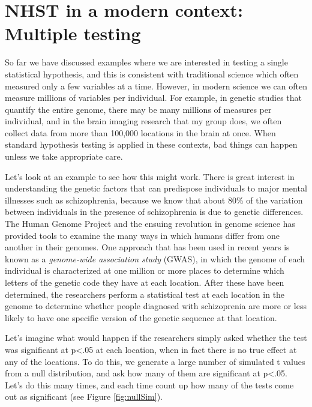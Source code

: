 \documentclass[12pt,]{book}
\theoremstyle{definition}
\theoremstyle{definition}
\theoremstyle{definition}
\theoremstyle{remark}
\begin{document}
\hypertarget{nhst-in-a-modern-context-multiple-testing}{%
\section{NHST in a modern context: Multiple testing}\label{nhst-in-a-modern-context-multiple-testing}}

So far we have discussed examples where we are interested in testing a single statistical hypothesis, and this is consistent with traditional science which often measured only a few variables at a time. However, in modern science we can often measure millions of variables per individual. For example, in genetic studies that quantify the entire genome, there may be many millions of measures per individual, and in the brain imaging research that my group does, we often collect data from more than 100,000 locations in the brain at once. When standard hypothesis testing is applied in these contexts, bad things can happen unless we take appropriate care.

Let's look at an example to see how this might work. There is great interest in understanding the genetic factors that can predispose individuals to major mental illnesses such as schizophrenia, because we know that about 80\% of the variation between individuals in the presence of schizophrenia is due to genetic differences. The Human Genome Project and the ensuing revolution in genome science has provided tools to examine the many ways in which humans differ from one another in their genomes. One approach that has been used in recent years is known as a \emph{genome-wide association study} (GWAS), in which the genome of each individual is characterized at one million or more places to determine which letters of the genetic code they have at each location. After these have been determined, the researchers perform a statistical test at each location in the genome to determine whether people diagnosed with schizoprenia are more or less likely to have one specific version of the genetic sequence at that location.

Let's imagine what would happen if the researchers simply asked whether the test was significant at p\textless{}.05 at each location, when in fact there is no true effect at any of the locations. To do this, we generate a large number of simulated t values from a null distribution, and ask how many of them are significant at p\textless{}.05. Let's do this many times, and each time count up how many of the tests come out as significant (see Figure \ref{fig:nullSim}).
\end{document}
